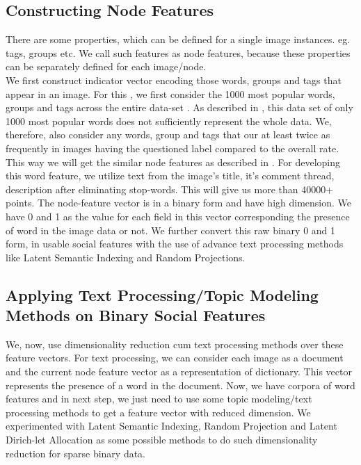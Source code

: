 \subsection{Constructing Node Features}
	There are some properties, which can be defined for a single image instances. eg. tags, groups etc. We call such features as node features, because these properties can be separately defined for each image/node. \\
	We first construct indicator vector encoding those words, groups and tags that appear in an image. For this , we first consider the 1000 most popular words, groups and tags across the entire data-set . As described in \cite{Jure}, this data set of only 1000 most popular words does not sufficiently represent the whole data. We, therefore, also consider any words, group and tags that our at least twice as frequently in images having the questioned label compared to the overall rate.  This way we will get the similar node features as described in \cite{Jure}. 
	 For developing this word feature, we utilize text from the image's title, it's comment thread, description after eliminating stop-words. This will give us more than 40000+ points. The node-feature vector is in a binary form and have high dimension. We have 0 and 1 as the value for each field in this vector corresponding the presence of word in the image data or not. We further convert this raw binary 0 and 1 form, in usable social features with the use of advance text processing methods like Latent Semantic Indexing and Random Projections.

\subsection{Applying Text Processing/Topic Modeling Methods on Binary Social Features}
 We, now, use dimensionality reduction cum text processing methods over these feature vectors. For text processing, we can consider each image as a document and the current node feature vector as a representation of dictionary. This vector represents the presence of a word in the document. Now, we have corpora of word features and in next step, we just need to use some topic modeling/text processing methods to get a feature vector with reduced dimension.
        We experimented with Latent Semantic Indexing, Random Projection and Latent Dirich-let Allocation as some possible methods to do such dimensionality reduction for sparse binary data.\\
